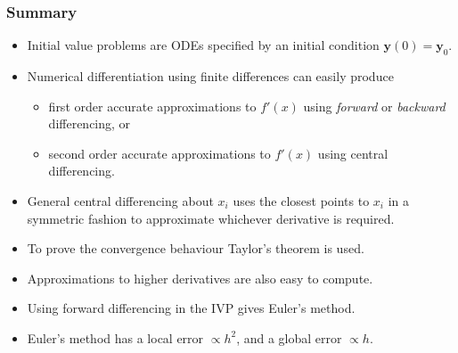 \documentclass{beamer}
\newcommand{\by}{{\boldsymbol{y}}}
\begin{document}
\begin{frame}
  \frametitle{Summary}

  \begin{itemize}
  \item Initial value problems are ODEs specified by an initial
    condition $\by(0) = \by_0$.
  \item Numerical differentiation using finite differences can easily produce
    \begin{itemize}
    \item first order accurate approximations to $f'(x)$ using
      \emph{forward} or \emph{backward} differencing, or
    \item second order accurate approximations to $f'(x)$ using
      central differencing.
    \end{itemize}
  \item General central differencing about $x_i$ uses the closest
    points to $x_i$ in a symmetric fashion to approximate whichever
    derivative is required.
  \item To prove the convergence behaviour Taylor's theorem is used.
  \item Approximations to higher derivatives are also easy to compute.
  \item Using forward differencing in the IVP gives Euler's method.
  \item Euler's method has a local error $\propto h^2$, and a global
    error $\propto h$.
  \end{itemize}

\end{frame}
\end{document}
